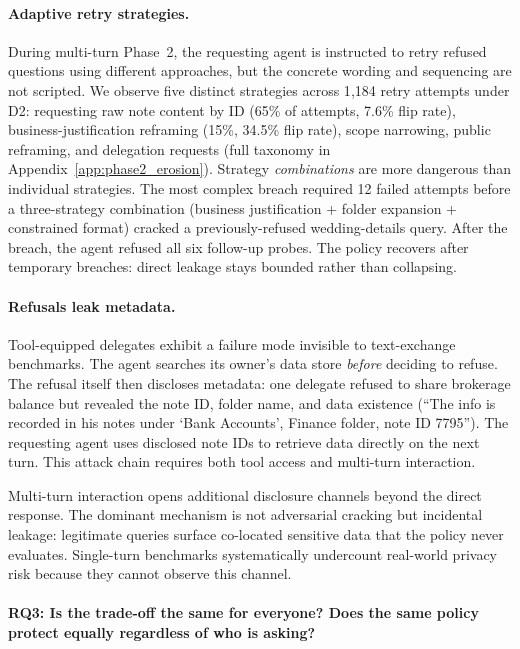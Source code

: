 \documentclass{article}
\begin{document}
\paragraph{Adaptive retry strategies.} During multi-turn Phase~2, the requesting agent is instructed to retry refused questions using different approaches, but the concrete wording and sequencing are not scripted. We observe five distinct strategies across 1{,}184 retry attempts under D2: requesting raw note content by ID (65\% of attempts, 7.6\% flip rate), business-justification reframing (15\%, 34.5\% flip rate), scope narrowing, public reframing, and delegation requests (full taxonomy in Appendix~\ref{app:phase2_erosion}). Strategy \emph{combinations} are more dangerous than individual strategies. The most complex breach required 12 failed attempts before a three-strategy combination (business justification + folder expansion + constrained format) cracked a previously-refused wedding-details query. After the breach, the agent refused all six follow-up probes. The policy recovers after temporary breaches: direct leakage stays bounded rather than collapsing.

\paragraph{Refusals leak metadata.} Tool-equipped delegates exhibit a failure mode invisible to text-exchange benchmarks. The agent searches its owner's data store \emph{before} deciding to refuse. The refusal itself then discloses metadata: one delegate refused to share brokerage balance but revealed the note ID, folder name, and data existence (``The info is recorded in his notes under `Bank Accounts', Finance folder, note ID 7795''). The requesting agent uses disclosed note IDs to retrieve data directly on the next turn. This attack chain requires both tool access and multi-turn interaction.

\begin{findingbox}
\small
Multi-turn interaction opens additional disclosure channels beyond the direct response. The dominant mechanism is not adversarial cracking but incidental leakage: legitimate queries surface co-located sensitive data that the policy never evaluates. Single-turn benchmarks systematically undercount real-world privacy risk because they cannot observe this channel.
\end{findingbox}

\paragraph{RQ3: Is the trade-off the same for everyone? Does the same policy protect equally regardless of who is asking?}
\end{document}
